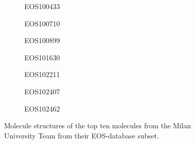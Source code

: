 \documentclass[11pt, letterpaper, titlepage]{article}
\begin{document}
\begin{figure}
    \begin{subfigure}[b]{0.3\textwidth}
         \centering
         
         \caption{EOS100433}
         \label{fig:EOS100433}
     \end{subfigure}
     \hfill
     \begin{subfigure}[b]{0.3\textwidth}
         \centering
         
         \caption{EOS100710}
         \label{fig:EOS100710}
     \end{subfigure}
     \hfill
     \begin{subfigure}[b]{0.3\textwidth}
         \centering
         
         \caption{EOS100899}
         \label{fig:EOS100899}
     \end{subfigure}
        \begin{subfigure}[b]{0.3\textwidth}
         \centering
         
         \caption{EOS101630}
         \label{fig:EOS101630}
     \end{subfigure}
     \hfill
     \begin{subfigure}[b]{0.3\textwidth}
         \centering
         
         \caption{EOS102211}
         \label{fig:EOS102211}
     \end{subfigure}
     \hfill
     \begin{subfigure}[b]{0.3\textwidth}
         \centering
         
         \caption{EOS102407}
         \label{fig:EOS102407}
     \end{subfigure}

     \hfill
     \begin{subfigure}[b]{\textwidth}
         \centering
         
         \caption{EOS102462}
         \label{fig:EOS102462}
     \end{subfigure}
        \caption{Molecule structures of the top ten molecules from the Milan University Team from their EOS-database subset.}
        \label{fig:our_top_ten_zinc}
\end{figure}

\FloatBarrier


\end{document}

